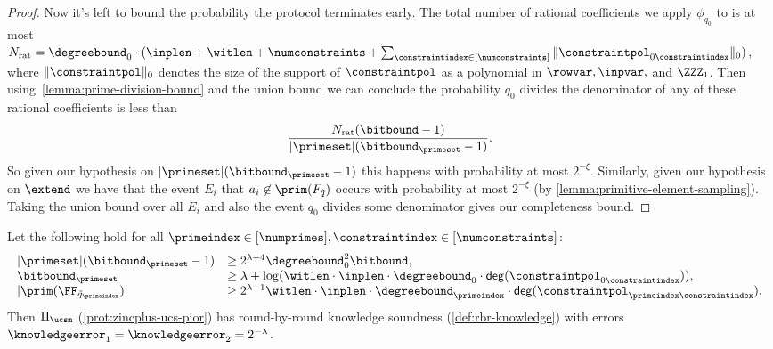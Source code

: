 \begin{proof}
Now it's left to bound the probability the protocol terminates early. The total number of rational coefficients we apply $\phi_{q_0}$ to is at most $N_{\mathrm{rat}} = \degreebound_0 \cdot (\inplen + \witlen + \numconstraints + \sum_{\constraintindex \in [\numconstraints]} \|\constraintpol_{0\constraintindex} \|_0)$, where $\|\constraintpol \|_0$ denotes the size of the support of $\constraintpol$ as a polynomial in $\rowvar,\inpvar,$ and $\ZZZ_1$. Then using~\cref{lemma:prime-division-bound} and the union bound we can conclude the probability $q_0$ divides the denominator of any of these rational coefficients is less than
\[
\frac{N_{\mathrm{rat}} (\bitbound-1)}{|\primeset|(\bitbound_\primeset-1)}.
\]
So given our hypothesis on $|\primeset|(\bitbound_\primeset - 1)$ this happens with probability at most $2^{-\xi}$. Similarly, given our hypothesis on $\extend$ we have that the event $E_i$ that $a_i \not\in \prim(F_{\tilde{q}})$ occurs with probability at most $2^{-\xi}$ (by \cref{lemma:primitive-element-sampling}). Taking the union bound over all $E_i$ and also the event $q_0$ divides some denominator gives our completeness bound.
\end{proof}

\begin{theorem}
\label{thm:zincplus-pior-knowledge}
Let the following hold for all $\primeindex \in [\numprimes], \constraintindex \in [\numconstraints]$:
\[
\begin{array}{ll}
|\primeset| (\bitbound_\primeset-1) &\geq 2^{\lambda+4} \degreebound_{0}^{2}\bitbound, \\
\bitbound_\primeset &\geq \lambda + \log(\witlen \cdot \inplen \cdot \degreebound_0 \cdot \mathsf{deg}(\constraintpol_{0\constraintindex})), \\
|\prim(\FF_{\tilde{q}_\primeindex})| &\geq 2^{\lambda+1} \witlen \cdot \inplen \cdot \degreebound_\primeindex \cdot \mathsf{deg}(\constraintpol_{\primeindex\constraintindex}).
\end{array}
\]
Then $\Pi_{\ucsm}$ (\cref{prot:zincplus-ucs-pior}) has round-by-round knowledge soundness (\cref{def:rbr-knowledge}) with errors $\knowledgeerror_1 = \knowledgeerror_2 = 2^{-\lambda}$.
\end{theorem}

